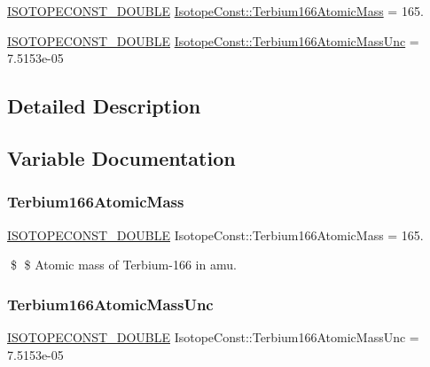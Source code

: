 \begin{DoxyCompactItemize}
\item 
\mbox{\hyperlink{group___isotope_const-_macros_ga8f45a7272ce02c0b4c65c44636ed719a}{I\+S\+O\+T\+O\+P\+E\+C\+O\+N\+S\+T\+\_\+\+D\+O\+U\+B\+LE}} \mbox{\hyperlink{group___isotope_const-_terbium-_tb166_gabb1458d7172ddea4d4fdb18c730ab86b}{Isotope\+Const\+::\+Terbium166\+Atomic\+Mass}} = 165.
\item 
\mbox{\hyperlink{group___isotope_const-_macros_ga8f45a7272ce02c0b4c65c44636ed719a}{I\+S\+O\+T\+O\+P\+E\+C\+O\+N\+S\+T\+\_\+\+D\+O\+U\+B\+LE}} \mbox{\hyperlink{group___isotope_const-_terbium-_tb166_ga912b2e47115e6d65e704a9a400b6e15c}{Isotope\+Const\+::\+Terbium166\+Atomic\+Mass\+Unc}} = 7.\+5153e-\/05
\end{DoxyCompactItemize}


\subsection{Detailed Description}


\subsection{Variable Documentation}
\mbox{\label{group___isotope_const-_terbium-_tb166_gabb1458d7172ddea4d4fdb18c730ab86b}} 
\subsubsection{\texorpdfstring{Terbium166\+Atomic\+Mass}{Terbium166AtomicMass}}
{\footnotesize\ttfamily \mbox{\hyperlink{group___isotope_const-_macros_ga8f45a7272ce02c0b4c65c44636ed719a}{I\+S\+O\+T\+O\+P\+E\+C\+O\+N\+S\+T\+\_\+\+D\+O\+U\+B\+LE}} Isotope\+Const\+::\+Terbium166\+Atomic\+Mass = 165.}

\$ \$ Atomic mass of Terbium-\/166 in amu. \mbox{\label{group___isotope_const-_terbium-_tb166_ga912b2e47115e6d65e704a9a400b6e15c}} 
\subsubsection{\texorpdfstring{Terbium166\+Atomic\+Mass\+Unc}{Terbium166AtomicMassUnc}}
{\footnotesize\ttfamily \mbox{\hyperlink{group___isotope_const-_macros_ga8f45a7272ce02c0b4c65c44636ed719a}{I\+S\+O\+T\+O\+P\+E\+C\+O\+N\+S\+T\+\_\+\+D\+O\+U\+B\+LE}} Isotope\+Const\+::\+Terbium166\+Atomic\+Mass\+Unc = 7.\+5153e-\/05}

